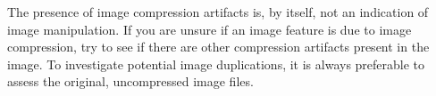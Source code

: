 \documentclass[letterpaper, 12pt]{article}
\begin{document}
The presence of image compression artifacts is, by itself, not an indication of image manipulation. If you are unsure if an image feature is due to image compression, try to see if there are other compression artifacts present in the image. To investigate potential image duplications, it is always preferable to assess the original, uncompressed image files.
\end{document}
